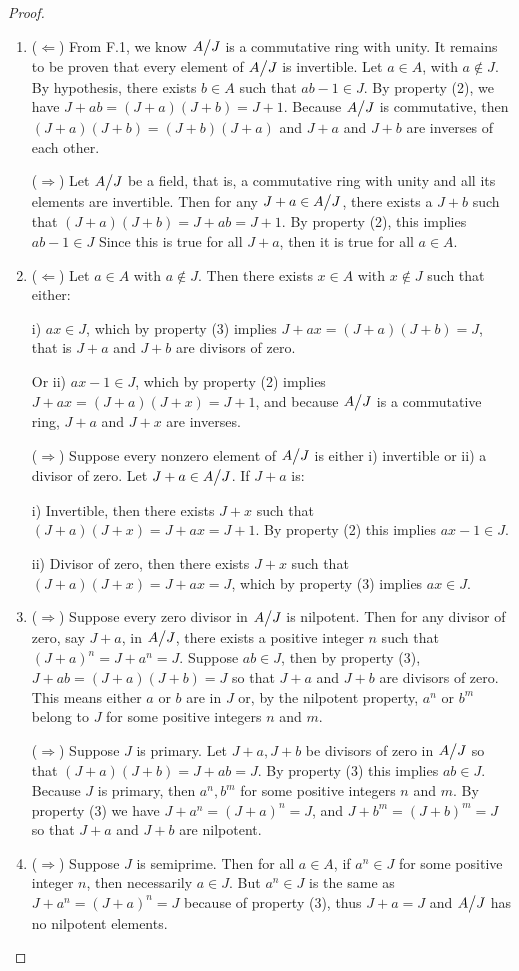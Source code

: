 \begin{proof}
\begin{enumerate}
 \item ($\Leftarrow$) From F.1, we know ${\textstyle A}\big/{\textstyle J}$ is a commutative ring with unity. It remains to be proven that every element of ${\textstyle A}\big/{\textstyle J}$ is invertible. Let $a\in A$, with $a\notin J$. By hypothesis, there exists $b\in A$ such that $ab-1\in J$. By property (2), we have $J+ab=(J+a)(J+b)=J+1$. Because ${\textstyle A}\big/{\textstyle J}$ is commutative, then $(J+a)(J+b)=(J+b)(J+a)$ and $J+a$ and $J+b$ are inverses of each other.

 ($\Rightarrow$) Let ${\textstyle A}\big/{\textstyle J}$ be a field, that is, a commutative ring with unity and all its elements are invertible. Then for any $J+a\in{\textstyle A}\big/{\textstyle J}$, there exists a $J+b$ such that $(J+a)(J+b)=J+ab=J+1$. By property (2), this implies $ab-1\in J$ Since this is true for all $J+a$, then it is true for all $a\in A$.
 \item ($\Leftarrow$) Let $a\in A$ with $a\notin J$. Then there exists $x\in A$ with $x\notin J$ such that either: 
 
 i) $ax\in J$, which by property (3) implies $J+ax=(J+a)(J+b)=J$, that is $J+a$ and $J+b$ are divisors of zero. 
 
 Or ii) $ax-1\in J$, which by property (2) implies $J+ax=(J+a)(J+x)=J+1$, and because ${\textstyle A}\big/{\textstyle J}$ is a commutative ring, $J+a$ and $J+x$ are inverses. 

 ($\Rightarrow$) Suppose every nonzero element of ${\textstyle A}\big/{\textstyle J}$ is either i) invertible or ii) a divisor of zero. Let $J+a\in{\textstyle A}\big/{\textstyle J}$. If $J+a$ is:

 i) Invertible, then there exists $J+x$ such that $(J+a)(J+x)=J+ax=J+1$. By property (2) this implies $ax-1\in J$.

 ii) Divisor of zero, then there exists $J+x$ such that $(J+a)(J+x)=J+ax=J$, which by property (3) implies $ax\in J$.
 \item ($\Rightarrow$) Suppose every zero divisor in ${\textstyle A}\big/{\textstyle J}$ is nilpotent. Then for any divisor of zero, say $J+a$, in ${\textstyle A}\big/{\textstyle J}$, there exists a positive integer $n$ such that $(J+a)^{n}=J+a^{n}=J$. Suppose $ab\in J$, then by property (3), $J+ab=(J+a)(J+b)=J$ so that $J+a$ and $J+b$ are divisors of zero. This means either $a$ or $b$ are in $J$ or, by the nilpotent property, $a^{n}$ or $b^{m}$ belong to $J$ for some positive integers $n$ and $m$.

 ($\Rightarrow$) Suppose $J$ is primary. Let $J+a, J+b$ be divisors of zero in ${\textstyle A}\big/{\textstyle J}$ so that $(J+a)(J+b)=J+ab=J$. By property (3) this implies $ab\in J$. Because $J$ is primary, then $a^{n},b^{m}$ for some positive integers $n$ and $m$. By property (3) we have $J+a^{n}=(J+a)^{n}=J$, and $J+b^{m}=(J+b)^{m}=J$ so that $J+a$ and $J+b$ are nilpotent.
 \item ($\Rightarrow$) Suppose $J$ is semiprime. Then for all $a\in A$, if $a^{n}\in J$ for some positive integer $n$, then necessarily $a\in J$. But $a^{n}\in J$ is the same as $J+a^{n}=(J+a)^{n}=J$ because of property (3), thus $J+a=J$ and ${\textstyle A}\big/{\textstyle J}$ has no nilpotent elements.


\end{enumerate}
\end{proof}
